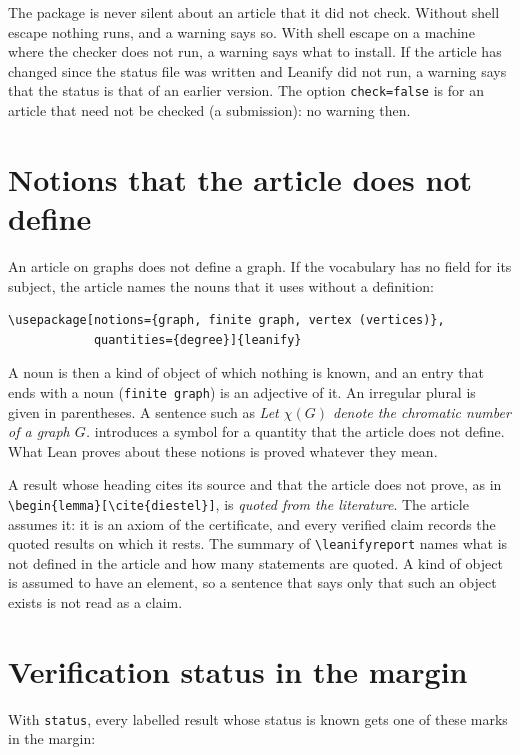 \documentclass[11pt]{article}
\newcommand*\opt[1]{\texttt{#1}}
\newcommand*\cs[1]{\texttt{\textbackslash#1}}
\begin{document}
The package is never silent about an article that it did not check. Without
shell escape nothing runs, and a warning says so. With shell escape on a machine
where the checker does not run, a warning says what to install. If the article
has changed since the status file was written and Leanify did not run, a
warning says that the status is that of an earlier version. The option
\opt{check=false} is for an article that need not be checked (a submission):
no warning then.

\section{Notions that the article does not define}\label{sec:notions}

An article on graphs does not define a graph. If the vocabulary has no field for
its subject, the article names the nouns that it uses without a definition:
\begin{lstlisting}
\usepackage[notions={graph, finite graph, vertex (vertices)},
            quantities={degree}]{leanify}
\end{lstlisting}
A noun is then a kind of object of which nothing is known, and an entry that ends
with a noun (\texttt{finite graph}) is an adjective of it. An irregular plural is
given in parentheses. A sentence such as \emph{Let $\chi(G)$ denote the chromatic
number of a graph $G$.} introduces a symbol for a quantity that the article does
not define. What Lean proves about these notions is proved whatever they mean.

A result whose heading cites its source and that the article does not prove, as in
\verb|\begin{lemma}[\cite{diestel}]|, is \emph{quoted from the literature}. The
article assumes it: it is an axiom of the certificate, and every verified claim
records the quoted results on which it rests. The summary of \cs{leanifyreport}
names what is not defined in the article and how many statements are quoted. A
kind of object is assumed to have an element, so a sentence that says only that
such an object exists is not read as a claim.

\section{Verification status in the margin}\label{sec:status}

With \opt{status}, every labelled result whose status is known gets one of these
marks in the margin:
\end{document}
